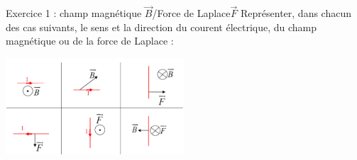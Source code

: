 \documentclass[12pt, french]{article}
\begin{document}
\begin{center}
\end{center}


   \begin{Box2}{Exercice 1 : champ
      magnétique $\vec{B}$/Force de Laplace$\vec{F}$  }
Représenter, dans chacun des cas suivants, le sens et la direction du courent électrique, du champ
magnétique ou de la force de Laplace :
  \begin{center}
     \vspace{-0.5cm}
    \includegraphics[width=0.5\textwidth]{./img/Ex_00.png}
  \end{center}


   \end{Box2}
\end{document}
